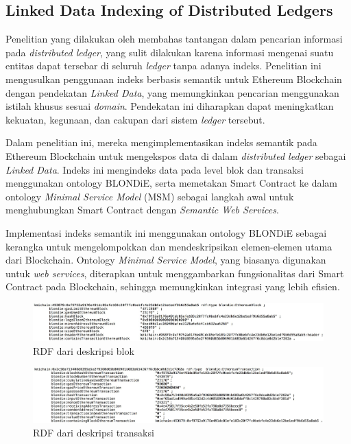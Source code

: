 \subsection{Linked Data Indexing of Distributed Ledgers}
\label{subsec:linked-data-indexing-distributed-ledgers}

Penelitian yang dilakukan oleh \cite{third2017linked} membahas tantangan dalam pencarian informasi pada \textit{distributed ledger}, yang sulit dilakukan karena informasi mengenai suatu entitas dapat tersebar di seluruh \textit{ledger} tanpa adanya indeks. Penelitian ini mengusulkan penggunaan indeks berbasis semantik untuk Ethereum Blockchain dengan pendekatan \textit{Linked Data}, yang memungkinkan pencarian menggunakan istilah khusus sesuai \textit{domain}. Pendekatan ini diharapkan dapat meningkatkan kekuatan, kegunaan, dan cakupan dari sistem \textit{ledger} tersebut.

Dalam penelitian ini, mereka mengimplementasikan indeks semantik pada Ethereum Blockchain untuk mengekspos data di dalam \textit{distributed ledger} sebagai \textit{Linked Data}. Indeks ini mengindeks data pada level blok dan transaksi menggunakan ontology BLONDiE, serta memetakan Smart Contract ke dalam ontology \textit{Minimal Service Model} (MSM) sebagai langkah awal untuk menghubungkan Smart Contract dengan \textit{Semantic Web Services}.

Implementasi indeks semantik ini menggunakan ontology BLONDiE sebagai kerangka untuk mengelompokkan dan mendeskripsikan elemen-elemen utama dari Blockchain. Ontology \textit{Minimal Service Model}, yang biasanya digunakan untuk \textit{web services}, diterapkan untuk menggambarkan fungsionalitas dari Smart Contract pada Blockchain, sehingga memungkinkan integrasi yang lebih efisien.

\begin{figure}[ht]
	\centering
	\includegraphics[width=1\textwidth]{resources/chapter-2/rdf-block.jpg}
	\caption{RDF dari deskripsi blok \parencite{third2017linked}}
	\label{image:rdf-block}
\end{figure}

\begin{figure}[ht]
	\centering
	\includegraphics[width=1\textwidth]{resources/chapter-2/rdf-transaction.jpg}
	\caption{RDF dari deskripsi transaksi \parencite{third2017linked}}
	\label{image:rdf-transaction}
\end{figure}

